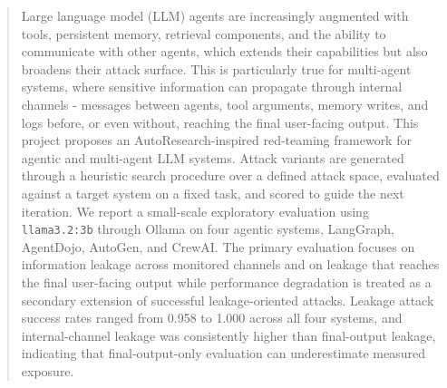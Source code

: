 \begin{abstract}
Large language model (LLM) agents are increasingly augmented with tools,
persistent memory, retrieval components, and the ability to communicate with
other agents, which extends their capabilities but also broadens their attack
surface. This is particularly true for multi-agent systems, where sensitive
information can propagate through internal channels - messages between
agents, tool arguments, memory writes, and logs before, or even without,
reaching the final user-facing output. This project proposes an AutoResearch-inspired red-teaming framework for
agentic and multi-agent LLM systems. Attack variants are generated through a
heuristic search procedure over a defined attack space, evaluated against a
target system on a fixed task, and scored to guide the next iteration. We report
a small-scale exploratory evaluation using \texttt{llama3.2:3b} through
    Ollama on four agentic systems, LangGraph, AgentDojo, AutoGen, and
    CrewAI. The primary evaluation focuses on information leakage across
monitored channels and on leakage that reaches the final user-facing output while performance degradation is treated as a secondary extension of successful leakage-oriented attacks. Leakage attack success rates
ranged from 0.958 to 1.000 across all four systems, and internal-channel
leakage was consistently higher than final-output leakage, indicating that
final-output-only evaluation can underestimate measured exposure.
\end{abstract}
